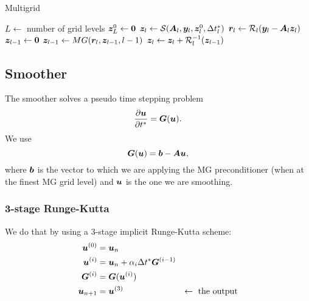 \documentclass{article}
\begin{document}
\begin{algorithm}
    \caption{Multigrid}\label{alg:multigrid}
    \begin{algorithmic}[l]
        \State $L \gets $ number of grid levels
        \State  $\bm{z}_L^0 \gets \bm{0}$ 
         
            \State $ \bm{z}_l \gets \mathcal{S}(\bm{A}_l, \bm{y}_l, \bm{z}_l^0, \Delta t^*_l) $
                \State $ \bm{r}_l \gets \mathcal{R}_l (\bm{y}_l - \bm{A}_l\bm{z}_l ) $
                \State $ \bm{z}_{l-1} \gets \bm{0} $ 
                   
                    \State $ \bm{z}_{l-1} \gets MG(\bm{r}_l, \bm{z}_{l-1}, l - 1) $ 
                \EndFor
                \State $ \bm{z}_l \gets \bm{z}_l + \mathcal{R}^{-1}_l(\bm{z}_{l-1}) $ 
            \EndIf
        \EndProcedure
    \end{algorithmic}
\end{algorithm}

\subsection{Smoother}\label{sec:smoother}

The smoother solves a pseudo time stepping problem 
\begin{equation}\label{eq:smoother_pseudo_time_step}
    \dfrac{\partial\bm{u}}{\partial t^*} = \bm{G}(\bm{u})
    \text{.}
\end{equation}
We use
\begin{equation}
    \bm{G}(\bm{u}) = \bm{b} - \bm{A}\bm{u}
    \text{,}
\end{equation}
where $\bm{b}$ is the vector to which we are applying the MG preconditioner (when at the finest MG grid level) and $\bm{u}$ is the one we are smoothing.


\subsubsection{3-stage Runge-Kutta}

We do that by using a 3-stage implicit Runge-Kutta scheme:
\begin{subequations}
\begin{align}
    \bm{u}^{(0)}        &= \bm{u}_{n} \\
    \bm{u}^{(i)}        &= \bm{u}_{n} + \alpha_i\Delta t^*\bm{G}^{(i-1)}
            \label{eq:smoother_with_precond} \\
    \bm{G}^{(i)}  &= \bm{G}(\bm{u}^{(i)}) \\
    \bm{u}_{n+1}        &= \bm{u}^{(3)} & \leftarrow \text{ the output}
\end{align}
\end{subequations}
\end{document}
